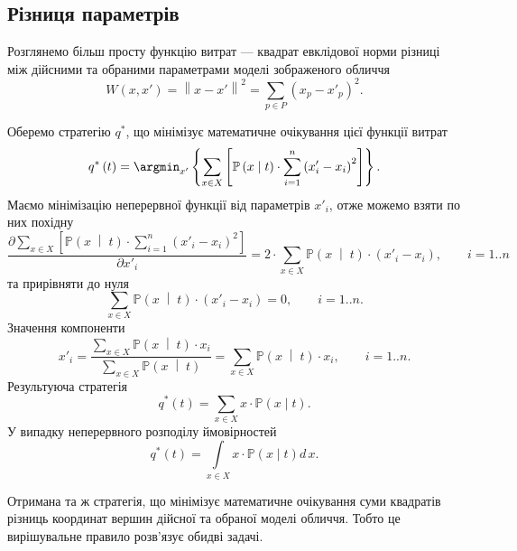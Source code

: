 \subsection{Різниця параметрів}

Розглянемо більш просту функцію витрат ---
квадрат евклідової норми різниці між дійсними та обраними параметрами
моделі зображеного обличчя
\begin{equation*}
  W \left( x, x' \right)
  = \left\| x - x' \right\|^2
  = \sum_{p \in P} \left( x_p - x'_p \right)^2.
\end{equation*}

Оберемо стратегію $q^*$,
що мінімізує математичне очікування цієї функції витрат
\begin{equation*}
  q^* \left( t \right)
  = \argmin_{x'} \left\{
    \sum\limits_{x \in X} \left[
        \mathbb{P} \left( x \;\middle|\;  t \right)
        \cdot \sum_{i = 1}^n \left( x'_i - x_i \right)^2
      \right]
    \right\}.
\end{equation*}
Маємо мінімізацію неперервної функції від параметрів $x'_i$,
отже можемо взяти по них похідну
\begin{equation*}
  \frac{\partial \sum\limits_{x \in X} \left[
      \mathbb{P} \left( x \;\middle|\;  t \right)
      \cdot \sum\limits_{i = 1}^n \left( x'_i - x_i \right)^2
  \right]}{\partial x'_i}
  = 2 \cdot \sum_{x \in X} \mathbb{P} \left( x \;\middle|\;  t \right)
    \cdot \left( x'_i - x_i \right), \qquad i = 1..n
\end{equation*}
та прирівняти до нуля
\begin{equation*}
  \sum_{x \in X} \mathbb{P} \left( x \;\middle|\;  t \right)
  \cdot \left( x'_i - x_i \right) = 0, \qquad i = 1..n.
\end{equation*}
Значення компоненти
\begin{equation*}
  x'_i = \frac{\sum\limits_{x \in X}
    \mathbb{P} \left( x \;\middle|\;  t \right) \cdot x_i}
    {\sum\limits_{x \in X}
      \mathbb{P} \left( x \;\middle|\;  t \right)}
  = \sum\limits_{x \in X}
    \mathbb{P} \left( x \;\middle|\;  t \right) \cdot x_i, \qquad i = 1..n.
\end{equation*}
Результуюча стратегія
\begin{equation*}
  q^*\left( t \right)
  = \sum_{x \in X} x \cdot \mathbb{P}\left( x \mid t \right).
\end{equation*}
У випадку неперервного розподілу ймовірностей
\begin{equation*}
  q^*\left( t \right)
  = \int\limits_{x \in X} x \cdot \mathbb{P}\left( x \mid t \right) d\,x.
\end{equation*}

Отримана та ж стратегія,
що мінімізує математичне очікування суми квадратів різниць
координат вершин дійсної та обраної моделі обличчя.
Тобто це вирішувальне правило розв'язує обидві задачі.
